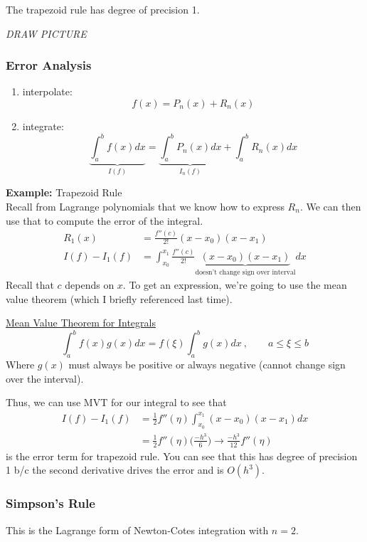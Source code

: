 \documentclass[12pt]{article}
\begin{document}
The trapezoid rule has degree of precision 1.

\textit{DRAW PICTURE}

\subsubsection*{Error Analysis}
\begin{enumerate}
\item interpolate:
\[f(x) = P_n(x) + R_n(x)\]
\item integrate:
\[\underbrace{\int_a^b f(x) dx}_{I(f)} = \underbrace{\int_a^b P_n(x)dx}_{I_n(f)} + \int_a^b R_n(x) dx\]
\end{enumerate}

\textbf{Example:} Trapezoid Rule\\
Recall from Lagrange polynomials that we know how to express $R_n$. We can then use that to compute the error of the integral.
\begin{align*}
R_1(x) &= \frac{f''(c)}{2!}(x-x_0)(x-x_1) \\
I(f) - I_1(f) &= \int_{x_0}^{x_1} \frac{f''(c)}{2!}\underbrace{(x-x_0)(x-x_1)}_{\text{doesn't change sign over interval}} dx
\end{align*}
%
Recall that $c$ depends on $x$. To get an expression, we're going to use the mean value theorem (which I briefly referenced last time).

\underline{Mean Value Theorem for Integrals}\\
\[\int_a^b f(x)g(x)dx = f(\xi) \int_a^b g(x)dx\:, \qquad a\leq \xi \leq b\]
Where $g(x)$ must always be positive or always negative (cannot change sign over the interval).

Thus, we can use MVT for our integral to see that
\begin{align*}
I(f) - I_1(f) &= \frac{1}{2}f''(\eta) \int_{x_0}^{x_1} (x-x_0)(x-x_1) dx \\
&= \frac{1}{2}f''(\eta) \bigl(\frac{-h^3}{6}\bigr) \rightarrow \boxed{\frac{-h^3}{12}f''(\eta)}
\end{align*}
is the error term for trapezoid rule. You can see that this has degree of precision 1 b/c the second derivative drives the error and is $O(h^3)$.


\subsubsection*{Simpson's Rule}
This is the Lagrange form of Newton-Cotes integration with $n=2$.
\end{document}
